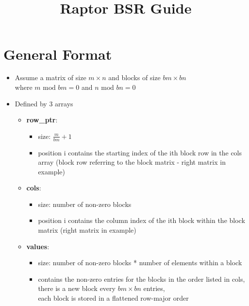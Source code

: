 \documentclass{article}
\title{Raptor BSR Guide}
\begin{document}
\maketitle

\section*{General Format}

\begin{itemize}
    \item Assume a matrix of size $m \times n$ and blocks of
          size $bm \times bn$ \\ 
          where $m \text{ mod } bm = 0  $ and $n \text{ mod } bn = 0$
    \item Defined by 3 arrays
    \begin{itemize}
        \item \textbf{row\_ptr}: 
        \begin{itemize}
            \item size: $\frac{m}{bm} + 1$
            \item position i contains the starting index of the ith block row in the cols array
            (block row referring to the block matrix - right matrix in example)
        \end{itemize}
        \item \textbf{cols}: 
        \begin{itemize}
            \item size: number of non-zero blocks
            \item position i contains the column index of the ith block within the block matrix
            (right matrix in example)
        \end{itemize}
        \item \textbf{values}:
        \begin{itemize}
            \item size: number of non-zero blocks * number of elements within
                        a block
            \item contains the non-zero entries for the blocks in the order listed in cols, \\
            there is a new block every $bm \times bn$ entries, \\
            each block is stored in a flattened row-major order
        \end{itemize}
    \end{itemize}
    

\end{itemize}
\end{document}
